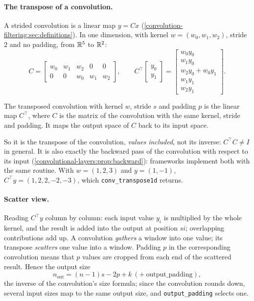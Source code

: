 \begin{notechapter}
\paragraph{The transpose of a convolution.} A strided convolution is a linear map
$y = Cx$ (\cref{convolution-filtering:sec:definitions}). In one dimension, with kernel $w = (w_0, w_1, w_2)$, stride $2$
and no padding, from $\mathbb{R}^5$ to $\mathbb{R}^2$:
\[
  C = \begin{bmatrix} w_0 & w_1 & w_2 & 0 & 0\\ 0 & 0 & w_0 & w_1 & w_2\end{bmatrix},\qquad
  C^\top\begin{bmatrix}y_0\\y_1\end{bmatrix} = \begin{bmatrix}w_0y_0\\ w_1y_0\\ w_2y_0 + w_0y_1\\ w_1y_1\\ w_2y_1\end{bmatrix} .
\]

\begin{definition}\label{fully-convolutional:def:transposed}
The transposed convolution with kernel $w$, stride $s$ and padding $p$ is the linear map $C^\top$, where $C$ is
the matrix of the convolution with the same kernel, stride and padding. It maps the output
space of $C$ back to its input space.
\end{definition}

So it is the transpose of the convolution, \emph{values included}, not its inverse: $C^\top C\neq I$ in
general. It is also exactly the backward pass of the convolution with respect to its input
(\cref{convolutional-layers:prop:backward}): frameworks implement both with the same
routine. With $w = (1,2,3)$ and $y = (1,-1)$, $C^\top y = (1, 2, 2, -2, -3)$, which \texttt{conv\_transpose1d} returns.

\paragraph{Scatter view.} Reading $C^\top y$ column by column: each input value $y_i$ is multiplied by the
whole kernel, and the result is added into the output at position $si$; overlapping
contributions add up. A convolution \emph{gathers} a window into one value; its transpose
\emph{scatters} one value into a window. Padding $p$ in the corresponding convolution means that $p$
values are cropped from each end of the scattered result. Hence the output size
\[
  n_{\mathrm{out}} = (n - 1)s - 2p + k\ (+\ \text{output\_padding}),
\]
the inverse of the convolution's size formula; since the convolution rounds down, several
input sizes map to the same output size, and \texttt{output\_padding} selects one.


\end{notechapter}
